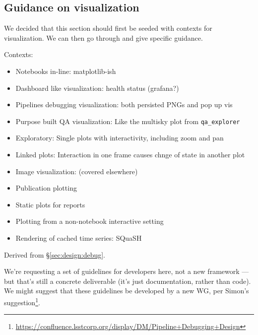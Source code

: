\subsection{Guidance on visualization}

We decided that this section should first be seeded with contexts for visualization. We can then go through and give specific guidance.

Contexts:
\begin{itemize}
\item Notebooks in-line: matplotlib-ish
\item Dashboard like visualization: health status (grafana?)
\item Pipelines debugging visualization: both persisted PNGs and pop up vis
\item Purpose built QA visualization: Like the multisky plot from \texttt{qa\_explorer}
\item Exploratory: Single plots with interactivity, including zoom and pan
\item Linked plots: Interaction in one frame causes chnge of state in another plot
\item Image visualization: (covered elsewhere)
\item Publication plotting
\item Static plots for reports
\item Plotting from a non-notebook interactive setting
\item Rendering of cached time series: SQuaSH
\end{itemize}

Derived from \S\ref{sec:design:debug}.

We're requesting a set of guidelines for developers here, not a new framework
--- but that's still a concrete deliverable (it's just documentation, rather
than code). We might suggest that these guidelines be developed by a new WG,
per Simon's
suggestion\footnote{\url{https://confluence.lsstcorp.org/display/DM/Pipeline+Debugging+Design}}.
